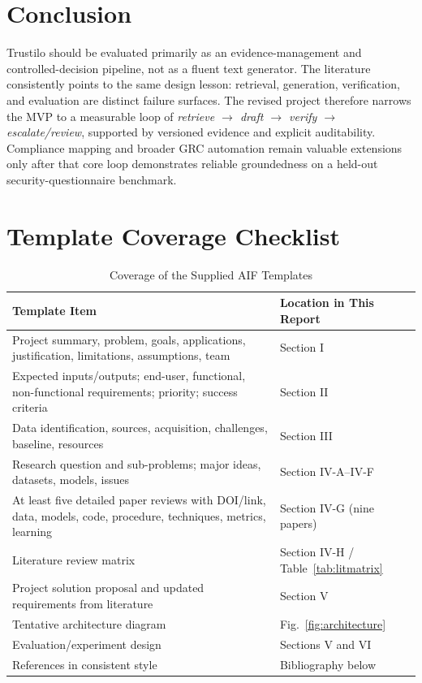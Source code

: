 \documentclass[11pt,journal,onecolumn]{IEEEtran}
\begin{document}
\section{Conclusion}
Trustilo should be evaluated primarily as an evidence-management and controlled-decision pipeline, not as a fluent text generator. The literature consistently points to the same design lesson: retrieval, generation, verification, and evaluation are distinct failure surfaces. The revised project therefore narrows the MVP to a measurable loop of \emph{retrieve $\rightarrow$ draft $\rightarrow$ verify $\rightarrow$ escalate/review}, supported by versioned evidence and explicit auditability. Compliance mapping and broader GRC automation remain valuable extensions only after that core loop demonstrates reliable groundedness on a held-out security-questionnaire benchmark.

\appendices
\section{Template Coverage Checklist}
\begin{table}[H]
\centering
\caption{Coverage of the Supplied AIF Templates}
\small
\begin{tabularx}{\textwidth}{L{0.36\textwidth}Y}
\toprule
\textbf{Template Item} & \textbf{Location in This Report} \\
\midrule
Project summary, problem, goals, applications, justification, limitations, assumptions, team & Section I \\
Expected inputs/outputs; end-user, functional, non-functional requirements; priority; success criteria & Section II \\
Data identification, sources, acquisition, challenges, baseline, resources & Section III \\
Research question and sub-problems; major ideas, datasets, models, issues & Section IV-A--IV-F \\
At least five detailed paper reviews with DOI/link, data, models, code, procedure, techniques, metrics, learning & Section IV-G (nine papers) \\
Literature review matrix & Section IV-H / Table~\ref{tab:litmatrix} \\
Project solution proposal and updated requirements from literature & Section V \\
Tentative architecture diagram & Fig.~\ref{fig:architecture} \\
Evaluation/experiment design & Sections V and VI \\
References in consistent style & Bibliography below \\
\bottomrule
\end{tabularx}
\end{table}
\end{document}
